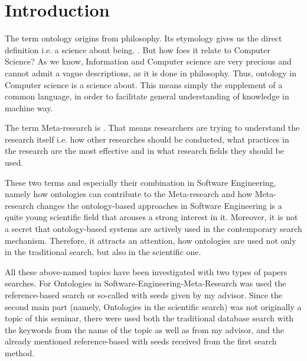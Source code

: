 
\section{Introduction}
\label{ch:Introduction}
The term ontology origins from philosophy. Its etymology gives us the direct definition i.e. a science about being. \frqq\cite{OntPh}. But how foes it relate to Computer Science? As we know, Information and Computer science are very precious and cannot admit a vague descriptions, as it is done in philosophy. Thus, ontology in Computer science is a science about\frqq\cite{OntCS}. This means simply the supplement of a common language, in order to facilitate general understanding of knowledge in machine way. 

The term Meta-research is \frqq\cite{MR}. That means researchers are trying to understand the research itself i.e. how other researches should be conducted, what practices in the research are the most effective and in what research fields they should be used. 

These two terms and especially their combination in Software Engineering, namely how ontologies can contribute to the Meta-research and how Meta-research changes the ontology-based approaches in Software Engineering is a quite young scientific field that arouses a strong interest in it. Moreover, it is not a secret that ontology-based systems are actively used in the contemporary search mechanism. Therefore, it attracts an attention, how ontologies are used not only in the traditional search, but also in the scientific one.

All these above-named topics have been investigated with two types of papers searches. For Ontologies in Software-Engineering-Meta-Research was used the reference-based search or so-called \frqq\cite{Woh14} with seeds given by my advisor. Since the second main part (namely, Ontologies in the scientific search) was not originally a topic of this seminar, there were used both the traditional database search with the keywords from the name of the topic as well as from my advisor, and the already mentioned reference-based with seeds received from the first search method.

